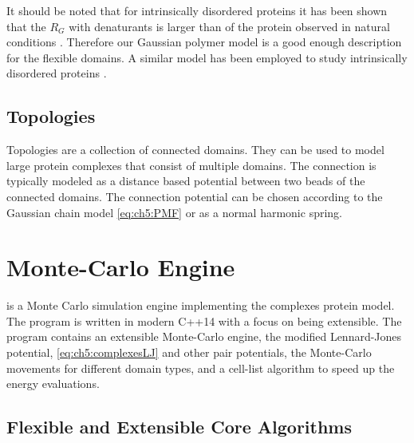 \documentclass[12pt, twoside]{report}
\begin{document}
It should be noted that for intrinsically disordered proteins it has been shown
that the \(R_G\) with denaturants is larger than of the protein observed in
natural conditions \cite{Fuertes2017, Song2017, Zheng2016, Borgia2016}.
Therefore our Gaussian polymer model is a good enough description for the
flexible domains. A similar model has been employed to study intrinsically
disordered proteins \cite{Dignon2018a}.

\section{Topologies}

Topologies are a collection of connected domains. They can be used to model
large protein complexes that consist of multiple domains. The connection is
typically modeled as a distance based potential between two beads of the
connected domains. The connection potential can be chosen according to the
Gaussian chain model \cref{eq:ch5:PMF} or as a normal harmonic spring.

\chapter{Monte-Carlo Engine \complexes}

\complexes is a Monte Carlo simulation engine implementing the complexes protein
model. The program is written in modern \mbox{C++14} with a focus on being
extensible. The program contains an extensible Monte-Carlo engine, the modified
Lennard-Jones potential, \cref{eq:ch5:complexesLJ} and other pair potentials,
the Monte-Carlo movements for different domain types, and a cell-list algorithm
\cite{frenkel2001understanding} to speed up the energy evaluations.


\section{Flexible and Extensible Core Algorithms}
\end{document}
